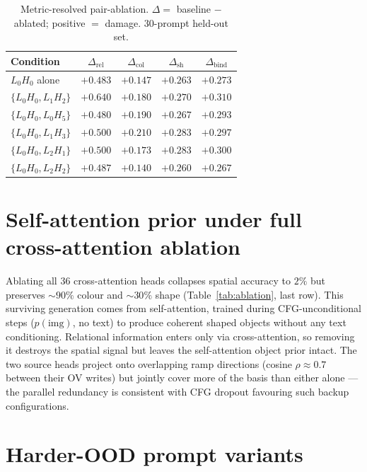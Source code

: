 \documentclass{article}
\begin{document}
\begin{table}[h]
\centering
\small
\caption{Metric-resolved pair-ablation. $\Delta = $ baseline $-$ ablated; positive $=$ damage. $30$-prompt held-out set.}
\label{tab:pair-ablation-resolved}
\begin{tabular}{lcccc}
\toprule
Condition & $\Delta_\text{rel}$ & $\Delta_\text{col}$ & $\Delta_\text{sh}$ & $\Delta_\text{bind}$ \\
\midrule
$L_0H_0$ alone     & $+0.483$ & $+0.147$ & $+0.263$ & $+0.273$ \\
$\{L_0H_0, L_1H_2\}$ & $+0.640$ & $+0.180$ & $+0.270$ & $+0.310$ \\
$\{L_0H_0, L_0H_5\}$ & $+0.480$ & $+0.190$ & $+0.267$ & $+0.293$ \\
$\{L_0H_0, L_1H_3\}$ & $+0.500$ & $+0.210$ & $+0.283$ & $+0.297$ \\
$\{L_0H_0, L_2H_1\}$ & $+0.500$ & $+0.173$ & $+0.283$ & $+0.300$ \\
$\{L_0H_0, L_2H_2\}$ & $+0.487$ & $+0.140$ & $+0.260$ & $+0.267$ \\
\bottomrule
\end{tabular}
\end{table}

\section{Self-attention prior under full cross-attention ablation}
\label{app:cfg-prior}

Ablating all 36 cross-attention heads collapses spatial accuracy to $2\%$ but preserves $\sim\!90\%$ colour and $\sim\!30\%$ shape (Table~\ref{tab:ablation}, last row). This surviving generation comes from self-attention, trained during CFG-unconditional steps ($p(\text{img})$, no text) to produce coherent shaped objects without any text conditioning. Relational information enters only via cross-attention, so removing it destroys the spatial signal but leaves the self-attention object prior intact. The two source heads project onto overlapping ramp directions (cosine $\rho\!\approx\!0.7$ between their OV writes) but jointly cover more of the basis than either alone --- the parallel redundancy is consistent with CFG dropout favouring such backup configurations.

\section{Harder-OOD prompt variants}
\label{app:harder-ood}
\end{document}
